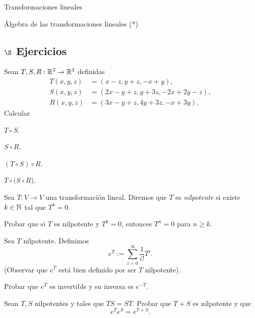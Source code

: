 \begin{chapter}{Transformaciones lineales}
\begin{section}{\'Algebra de las transformaciones lineales (*)}
        \subsection*{$\S$ Ejercicios}

        \begin{enumex}
            \item Sean $T,S, R: \mathbb R^3 \to \mathbb R^3$ definidas
            \begin{align*}
                T(x,y,z) &= (x-z, y+z, -x+y), \\
                S(x,y,z) &= (2x-y+z, y+3z, -2x+2y-z), \\
                R(x,y,z) &= (3x-y+z, 4y+3z, -x+3y).
            \end{align*}
            Calcular
                \begin{enumex}
                    \begin{minipage}{0.19\textwidth}
                    \item $T \circ S$.\end{minipage}
                    \begin{minipage}{0.19\textwidth}
                    \item $S \circ R$.\end{minipage}
                    \begin{minipage}{0.22\textwidth}
                    \item $(T \circ S) \circ R$.\end{minipage}
                    \begin{minipage}{0.2\textwidth}
                    \item $T \circ( S\circ R$).\end{minipage}
                \end{enumex}
            \item Sea $T: V \to V$ una transformación lineal. Diremos que $T$ es \textit{nilpotente} si existe $k \in \mathbb N$ tal que $T^k =0$. 
            \begin{enumex}
                \item Probar que si $T$ es nilpotente y $T^k=0$,  entonces $T^n = 0$ para $n \ge k$. 
                \item Sea $T$ nilpotente. Definimos
                $$
                e^T := \sum_{i=0}^\infty \frac1{i!}T^i.
                $$
                (Observar que $e^T$ está bien definido por ser $T$ nilpotente). 
                
                Probar que $e^T$ es invertible y su inversa es $e^{-T}$. 
                \item Sean $T, S$ nilpotentes y tales que $TS=ST$. Probar que $T+S$ es nilpotente y que
                $$
                e^{T}e^{S}= e^{T+S}.
                $$
            \end{enumex}
            

\end{enumex}
\end{section}
\end{chapter}
